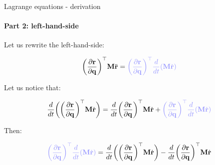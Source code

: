 \documentclass{beamer}
\begin{document}
\begin{frame}{Lagrange equations - derivation}
\framesubtitle{Part 2: left-hand-side}
\begin{flushleft}

Let us rewrite the left-hand-side:

\[
    \bigg( \frac{\partial \bo{r}}{\partial \bo{q}} \bigg) ^\top 
    \bo{M} \ddot{\bo{r}} = 
    \textcolor{myblue}
    {\bigg( \frac{\partial \bo{r}}{\partial \bo{q}} \bigg) ^\top 
    \frac{d}{dt} (\bo{M} \dot{\bo{r}})}
\]

Let us notice that:

\begin{equation}
    \frac{d}{dt} \bigg(\bigg( \frac{\partial \bo{r}}{\partial \bo{q}} \bigg) ^\top
    \bo{M} \dot{\bo{r}} \bigg) = 
    \frac{d}{dt} \bigg( \frac{\partial \bo{r}}{\partial \bo{q}} \bigg) ^\top
    \bo{M} \dot{\bo{r}} + 
    \textcolor{myblue}
    {\bigg( \frac{\partial \bo{r}}{\partial \bo{q}} \bigg) ^\top \frac{d}{dt}
    (\bo{M} \dot{\bo{r}})}
\end{equation}

Then:

\[
    \textcolor{myblue}
    {\bigg( \frac{\partial \bo{r}}{\partial \bo{q}} \bigg) ^\top 
    \frac{d}{dt} (\bo{M} \dot{\bo{r}})} = 
    \frac{d}{dt} \bigg(\bigg( \frac{\partial \bo{r}}{\partial \bo{q}} \bigg) ^\top
    \bo{M} \dot{\bo{r}} \bigg) - 
    \frac{d}{dt} \bigg( \frac{\partial \bo{r}}{\partial \bo{q}} \bigg) ^\top
    \bo{M} \dot{\bo{r}}
\]


\end{flushleft}
\end{frame}
\end{document}
